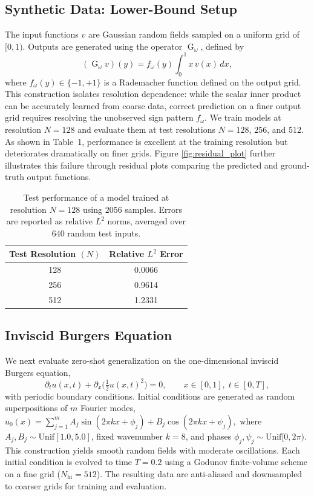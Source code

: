 \documentclass[11pt]{article}
\theoremstyle{plain}
\begin{document}
\subsection{Synthetic Data: Lower-Bound Setup}
The input functions $v$ are Gaussian random fields sampled on a
uniform grid of $[0,1)$. Outputs are generated using the operator $\operatorname{G}_\omega$, defined by
\[
 (\operatorname{G}_\omega v)(y) = f_\omega(y) \int_0^1 x\, v(x)\, dx,
\]
where $f_\omega(y) \in \{-1, +1\}$ is a Rademacher function defined on the output grid. This
construction isolates resolution dependence: while the scalar inner product can be accurately
learned from coarse data, correct prediction on a finer output grid requires resolving the
unobserved sign pattern $f_\omega$. We train models at resolution $N=128$ and evaluate them at test resolutions $N=128$, $256$, and
$512$. As shown in Table~1, performance is excellent at the training resolution but deteriorates
dramatically on finer grids.  Figure \ref{fig:residual_plot} further illustrates this failure through residual plots comparing the predicted and ground-truth output functions.
\begin{table}[ht]
\centering
\begin{tabular}{|c|c|}
\hline
\textbf{Test Resolution $(N)$} & \textbf{Relative $L^2$ Error} \\
\hline
\hline
128 & 0.0066 \\
256 &0.9614 \\
512 & 1.2331 \\
\hline
\end{tabular}
\caption{Test performance of a model trained at resolution $N=128$ using $2056$ samples. 
Errors are reported as relative $L^2$ norms, averaged over $640$ random test inputs.}
\end{table}




\subsection{Inviscid Burgers Equation}

We next evaluate zero-shot generalization on the one-dimensional inviscid Burgers equation,
\[
\partial_t u(x,t) + \partial_x\!\Big(\tfrac{1}{2}u(x,t)^2\Big) = 0, 
\qquad x \in [0,1], \; t \in [0,T],
\]
with periodic boundary conditions. Initial conditions are generated as random superpositions of $m$ Fourier modes, $
u_0(x) = \sum_{j=1}^{m} 
A_j \sin(2\pi k x + \phi_j) + 
B_j \cos(2\pi k x + \psi_j),
$
where $A_j,B_j \sim \mathrm{Unif}[1.0,5.0]$, fixed wavenumber $k=8$, and phases $\phi_j,\psi_j \sim \mathrm{Unif}[0,2\pi)$. This construction yields smooth random fields with moderate oscillations. Each initial condition is evolved to time $T=0.2$ using a Godunov finite-volume scheme on a fine grid ($N_{\mathrm{hi}}=512$). The resulting data are anti-aliased and downsampled to coarser grids for training and evaluation.
\end{document}
